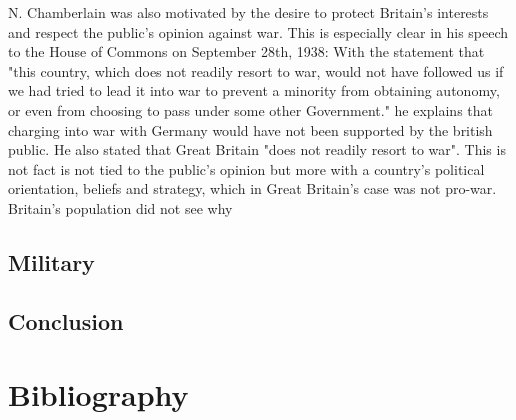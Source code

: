 \documentclass[10pt, a4papert, hidelinks]{article}
\begin{document}
N. Chamberlain was also motivated by the desire to protect Britain's interests and respect the public's opinion against war. This is especially clear in his speech to the House of Commons on September 28th, 1938: With the statement that "this country, which does not readily resort to war, would not have followed us if we had tried to lead it into war to prevent a  minority from obtaining autonomy, or even from choosing to pass under some other Government." \cite{prime_minister_statement_common_sittings_european_situation} he explains that charging into war with Germany would have not been supported by the british public. He also stated that Great Britain "does not readily resort to war". This is not fact is not tied to the public's opinion but more with a country's political orientation, beliefs and strategy, which in Great Britain's case was not pro-war.\\
Britain's population did not see why 

\subsection{Military}


\subsection{Conclusion}


\newpage
\section{Bibliography}
\printbibliography[heading=none]
\end{document}
